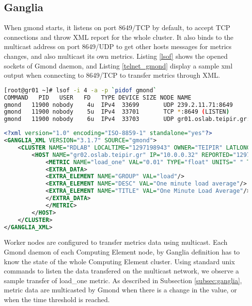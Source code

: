 \subsection{Ganglia}

When gmond starts, it listens on port 8649/TCP by default, to accept TCP connections and throw XML report for the whole cluster. It also binds to the multicast address on port 8649/UDP to get other hosts messages for metrics changes, and also multicast its own metrics. Listing \ref{lsof} shows the opened sockets of Gmond daemon, and Listing \ref{telnet_gmond} display a sample xml output when connecting to 8649/TCP to transfer metrics through XML.

\begin{lstlisting}[language=bash,caption=Gmond networking,label=lsof]
[root@gr01 ~]# lsof -i 4 -a -p `pidof gmond`
COMMAND   PID   USER   FD   TYPE DEVICE SIZE NODE NAME
gmond   11900 nobody    4u  IPv4  33699       UDP 239.2.11.71:8649 
gmond   11900 nobody    5u  IPv4  33701       TCP *:8649 (LISTEN)
gmond   11900 nobody    6u  IPv4  33703       UDP gr01.oslab.teipir.gr:39991->239.2.11.71:8649 
\end{lstlisting}

\begin{lstlisting}[language=XML,caption=Gmond XML cluster report,label=telnet_gmond]
<?xml version="1.0" encoding="ISO-8859-1" standalone="yes"?>
<GANGLIA_XML VERSION="3.1.7" SOURCE="gmond">
	<CLUSTER NAME="RDLAB" LOCALTIME="1297198943" OWNER="TEIPIR" LATLONG="unspecified" URL="unspecified">
		<HOST NAME="gr02.oslab.teipir.gr" IP="10.0.0.32" REPORTED="1297198934" TN="8" TMAX="20" DMAX="0" LOCATION="unspecified" GMOND_STARTED="1296569542">
			<METRIC NAME="load_one" VAL="0.01" TYPE="float" UNITS=" " TN="50" TMAX="70" DMAX="0" SLOPE="both">
			<EXTRA_DATA>
			<EXTRA_ELEMENT NAME="GROUP" VAL="load"/>
			<EXTRA_ELEMENT NAME="DESC" VAL="One minute load average"/>
			<EXTRA_ELEMENT NAME="TITLE" VAL="One Minute Load Average"/>
			</EXTRA_DATA>
			</METRIC>
		</HOST>
	</CLUSTER>
</GANGLIA_XML>
\end{lstlisting}

Worker nodes are configured to transfer metrics data using multicast. Each Gmond daemon of each Computing Element node, by Ganglia definition has to know the state of the whole Computing Element cluster. Using standard unix commands to listen the data transfered on the multicast network, we observe a sample transfer of load\_one metric. As described in Subsection \ref{subsec:ganglia}, metric data are multicasted by Gmond when there is a change in the value, or when the time threshold is reached.

